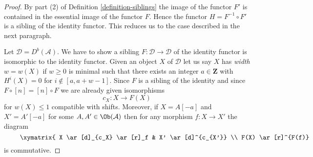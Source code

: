 \begin{proof}
By part (2) of Definition \ref{definition-siblings} the image of the functor
$F'$ is contained in the essential image of the functor $F$. Hence
the functor $H = F^{-1} \circ F'$ is a sibling of the identity functor.
This reduces us to the case described in the next paragraph.

\medskip\noindent
Let $\mathcal{D} = D^b(\mathcal{A})$. We have to show a sibling
$F : \mathcal{D} \to \mathcal{D}$ of the identity functor is
isomorphic to the identity functor. Given an object $X$ of $\mathcal{D}$
let us say $X$ has {\it width} $w = w(X)$ if $w \geq 0$ is minimal
such that there exists an integer $a \in \mathbf{Z}$ with $H^i(X) = 0$
for $i \not \in [a, a + w - 1]$. Since $F$ is a sibling of the identity
and since $F \circ [n] = [n] \circ F$ we are already given isomorphisms
$$
c_X : X \to F(X)
$$
for $w(X) \leq 1$ compatible with shifts. Moreover, if $X = A[-a]$ and
$X' = A'[-a]$ for some $A, A' \in \Ob(\mathcal{A})$ then for any morphism
$f : X \to X'$ the diagram
\begin{equation}
\label{equation-to-show}
\vcenter{
\xymatrix{
X \ar[d]_{c_X} \ar[r]_f &
X' \ar[d]^{c_{X'}} \\
F(X) \ar[r]^{F(f)} &
F(X')
}
}
\end{equation}
is commutative.


\end{proof}
